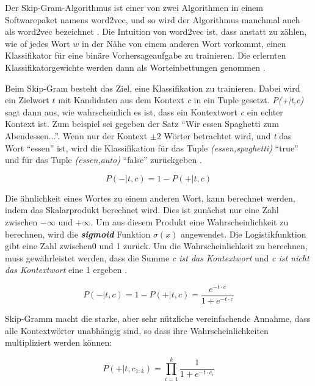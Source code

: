 Der Skip-Gram-Algorithmus ist einer von zwei Algorithmen in einem Softwarepaket namens word2vec, und so wird der Algorithmus manchmal auch als word2vec bezeichnet \cite*{Mikolov2013}\cite*{Mikolov}. Die Intuition von word2vec ist, dass anstatt zu zählen, wie of jedes Wort $w$ in der Nähe von einem anderen Wort vorkommt, einen Klassifikator für eine binäre Vorhersageaufgabe zu trainieren. Die erlernten Klassifikatorgewichte werden dann als Worteinbettungen genommen \cite*[111]{Jurafskya}.

Beim Skip-Gram besteht das Ziel, eine Klassifikation zu trainieren. Dabei wird ein Zielwort $t$ mit Kandidaten aus dem Kontext \textit{c} in ein Tuple gesetzt. \textit{P(+|t,c)} sagt dann aus, wie wahrscheinlich es ist, dass ein Kontextwort \textit{c} ein echter Kontext ist. Zum beispiel sei gegeben der Satz \enquote{Wir essen Spaghetti zum Abendessen...}. Wenn nur der Kontext $\pm 2$ Wörter betrachtet wird, und \textit{t} das Wort \enquote{essen} ist, wird die Klassifikation für das Tuple \textit{(essen,spaghetti)} \enquote{true} und für das Tuple \textit{(essen,auto)} \enquote{false} zurückgeben \cite*[111]{Jurafskya}.

\begin{equation} \label{Formel3_1}
    P(-|t,c) = 1-P(+|t,c)
\end{equation}

Die ähnlichkeit eines Wortes zu einem anderen Wort, kann berechnet werden, indem das Skalarprodukt berechnet wird. Dies ist zunächst nur eine Zahl zwischen $-\infty$ und $+\infty$. Um aus diesem Produkt eine Wahrscheinlichkeit zu berechnen, wird die \textbf{\textit{sigmoid}} Funktion $\sigma(x)$ angewendet. Die Logistikfunktion gibt eine Zahl zwischen0 und 1 zurück. Um die Wahrscheinlichkeit zu berechnen, muss gewährleistet werden, dass die Summe \textit{c ist das Kontextwort} und \textit{c ist nicht das Kontextwort} eine 1 ergeben \cite*[112]{Jurafskya}.

\begin{equation} \label{Formel3_2}
    P(-|t,c) = 1-P(+|t,c) = \frac{e^{-t\cdot c}}{1+e^{-t\cdot c}}
\end{equation}

Skip-Gramm macht die starke, aber sehr nützliche vereinfachende Annahme, dass alle Kontextwörter unabhängig sind, so dass ihre Wahrscheinlichkeiten multipliziert werden können:

\begin{equation} \label{Formel3_3}
    P(+|t,c_{1:k}) = \prod ^{k}_{i=1}\frac{1}{1+e^{-t\cdot c_{i}}}
\end{equation}


